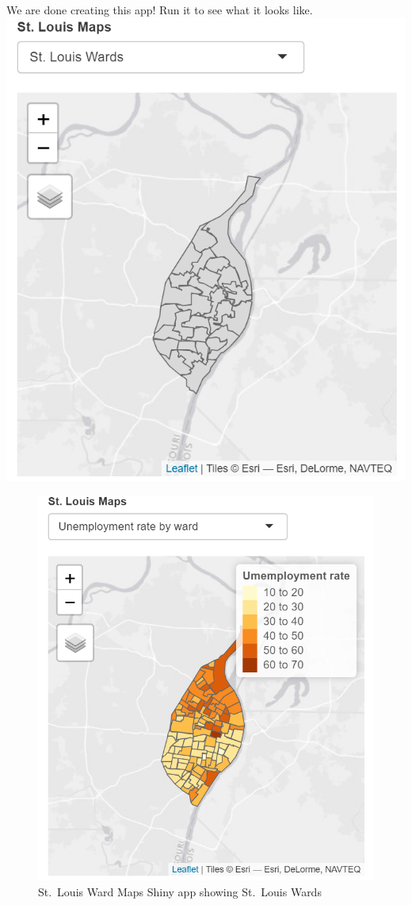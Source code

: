 \documentclass[
  krantz2]{krantz}
\begin{document}
We are done creating this app! Run it to see what it looks like. \includegraphics{images/shiny_app3.png}

\begin{figure}
\centering
\includegraphics{images/shiny_app4.png}
\caption{St.~Louis Ward Maps Shiny app showing St.~Louis Wards}
\end{figure}
\end{document}
